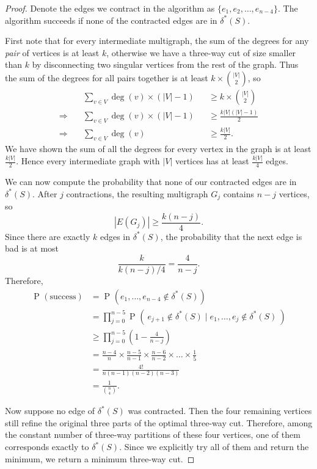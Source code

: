 \documentclass[14pt]{extreport}
\renewcommand{\Pr}[2][]{\operatorname{P}_{#1}\left(#2\right)}
\begin{document}
    \begin{proof}
    Denote the edges we contract in the algorithm as $\{e_{1}, e_{2}, \dots, e_{n - 4}\}$. The algorithm succeeds if none of the contracted edges are in $\delta^{*}(S)$.

    \vspace{5mm}
    First note that for every intermediate multigraph, the sum of the degrees for any \textit{pair} of vertices is at least $k$, otherwise we have a three-way cut of size smaller than $k$ by disconnecting two singular vertices from the rest of the graph. Thus the sum of the degrees for all pairs together is at least $ k \times \binom{|V|}{2} $, so
    $$\begin{alignedat}{2}
        & \quad \sum_{v \in V} \deg(v) \times (|V|-1) &&\ge k \times \binom{|V|}{2}  \\
         \Rightarrow& \quad \sum_{v \in V} \deg(v) \times (|V|-1) &&\ge \frac{k|V|(|V|-1)}{2} \\
         \Rightarrow& \quad \sum_{v \in V} \deg(v) &&\ge \frac{k|V|}{2}.
    \end{alignedat}$$
    We have shown the sum of all the degrees for every vertex in the graph is at least $\frac{k|V|}{2}$. Hence every intermediate graph with $|V|$ vertices has at least $\frac{k|V|}{4}$ edges.

    \vspace{5mm}
    We can now compute the probability that none of our contracted edges are in $\delta^{*}(S)$. After $j$ contractions, the resulting multigraph $G_{j}$ contains $n - j$ vertices, so
    $$|E(G_j)| \ge \frac{k(n - j)}{4}.$$
    Since there are exactly $k$ edges in $\delta^{*}(S)$, the probability that the next edge is bad is at most
    $$\frac{k}{k(n - j)/4} = \frac{4}{n - j}.$$
    Therefore,
    $$\begin{aligned}
        \Pr{\text{success}}
        &= \Pr{ e_{1}, \dots, e_{n - 4} \notin \delta^{*}(S)} \\
        &= \prod_{j = 0}^{n - 5}\Pr{\ e_{j + 1} \notin \delta^{*}(S) \mid e_{1}, \dots, e_{j} \notin \delta^{*}(S)\ } \\
        &\ge \prod_{j = 0}^{n - 5}\left(1 - \frac{4}{n - j}\right) \\
        &= \frac{n - 4}{n} \times \frac{n - 5}{n - 1} \times \frac{n - 6}{n - 2} \times \dots \times \frac{1}{5} \\
        &= \frac{4!}{n(n - 1)(n - 2)(n - 3)} \\
        &= \frac{1}{\binom{n}{4}}.
    \end{aligned}$$

    Now suppose no edge of $\delta^{*}(S)$ was contracted. Then the four remaining vertices still refine the original three parts of the optimal three-way cut. Therefore, among the constant number of three-way partitions of these four vertices, one of them corresponds exactly to $\delta^{*}(S)$. Since we explicitly try all of them and return the minimum, we return a minimum three-way cut.
    \end{proof}
\end{document}
